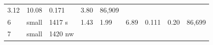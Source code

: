 \documentclass[
  10pt, ]{article}
\begin{document}
\begin{longtable}[]{@{}lllllllll@{}}
\begin{minipage}[t]{0.08\columnwidth}
3.12\strut
\end{minipage} & \begin{minipage}[t]{0.08\columnwidth}\raggedright
10.08\strut
\end{minipage} & \begin{minipage}[t]{0.08\columnwidth}\raggedright
0.171\strut
\end{minipage} & \begin{minipage}[t]{0.08\columnwidth}\raggedright
3.80\strut
\end{minipage} & \begin{minipage}[t]{0.08\columnwidth}\raggedright
86,909\strut
\end{minipage}\tabularnewline
\begin{minipage}[t]{0.08\columnwidth}\raggedright
6\strut
\end{minipage} & \begin{minipage}[t]{0.08\columnwidth}\raggedright
small\strut
\end{minipage} & \begin{minipage}[t]{0.08\columnwidth}\raggedright
1417 s\strut
\end{minipage} & \begin{minipage}[t]{0.08\columnwidth}\raggedright
1.43\strut
\end{minipage} & \begin{minipage}[t]{0.08\columnwidth}\raggedright
1.99\strut
\end{minipage} & \begin{minipage}[t]{0.08\columnwidth}\raggedright
6.89\strut
\end{minipage} & \begin{minipage}[t]{0.08\columnwidth}\raggedright
0.111\strut
\end{minipage} & \begin{minipage}[t]{0.08\columnwidth}\raggedright
0.20\strut
\end{minipage} & \begin{minipage}[t]{0.08\columnwidth}\raggedright
86,699\strut
\end{minipage}\tabularnewline
\begin{minipage}[t]{0.08\columnwidth}\raggedright
7\strut
\end{minipage} & \begin{minipage}[t]{0.08\columnwidth}\raggedright
small\strut
\end{minipage} & \begin{minipage}[t]{0.08\columnwidth}\raggedright
1420 nw\strut
\end{minipage} & \begin{minipage}[t]{0.08\columnwidth}\raggedright

\end{minipage}
\end{longtable}
\end{document}
